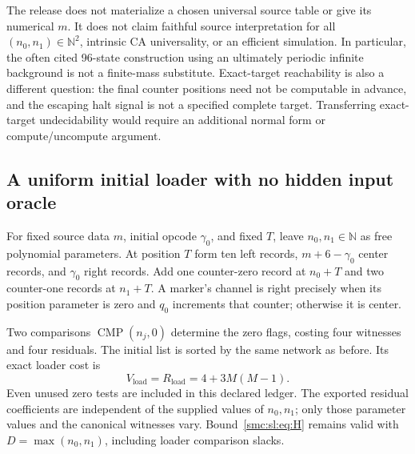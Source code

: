 \documentclass[11pt,letterpaper]{article}
\numberwithin{equation}{section}
\theoremstyle{definition}
\theoremstyle{remark}
\newcommand{\NN}{\mathbb N}
\newcommand{\CMP}{\operatorname{CMP}}
\begin{document}
The release does not materialize a chosen universal source table or give its numerical $m$. It does not claim faithful source interpretation for all $(n_0,n_1)\in\NN^2$, intrinsic CA universality, or an efficient simulation. In particular, the often cited 96-state construction using an ultimately periodic infinite background is not a finite-mass substitute. Exact-target reachability is also a different question: the final counter positions need not be computable in advance, and the escaping halt signal is not a specified complete target. Transferring exact-target undecidability would require an additional normal form or compute/uncompute argument.

\subsection{A uniform initial loader with no hidden input oracle}
For fixed source data $m$, initial opcode $\gamma_0$, and fixed $T$, leave $n_0,n_1\in\NN$ as free polynomial parameters. At position $T$ form ten left records, $m+6-\gamma_0$ center records, and $\gamma_0$ right records. Add one counter-zero record at $n_0+T$ and two counter-one records at $n_1+T$. A marker's channel is right precisely when its position parameter is zero and $q_0$ increments that counter; otherwise it is center.

Two comparisons $\CMP(n_j,0)$ determine the zero flags, costing four witnesses and four residuals. The initial list is sorted by the same network as before. Its exact loader cost is
\begin{equation}\label{smc:sl:eq:loader}
 V_{\mathrm{load}}=R_{\mathrm{load}}=4+3M(M-1).
\end{equation}
Even unused zero tests are included in this declared ledger. The exported residual coefficients are independent of the supplied values of $n_0,n_1$; only those parameter values and the canonical witnesses vary. Bound~\eqref{smc:sl:eq:H} remains valid with $D=\max(n_0,n_1)$, including loader comparison slacks.
\end{document}
